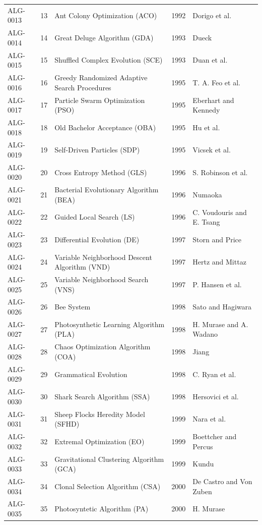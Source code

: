 \documentclass[8pt]{article}
\begin{document}
\begin{landscape}
\begin{longtable}{P{1.7cm}rP{10.0cm}rP{7.2cm}}
ALG-0013 & 13 & Ant Colony Optimization (ACO) & 1992 & Dorigo et al. \\
ALG-0014 & 14 & Great Deluge Algorithm (GDA) & 1993 & Dueck \\
ALG-0015 & 15 & Shuffled Complex Evolution (SCE) & 1993 & Duan et al. \\
ALG-0016 & 16 & Greedy Randomized Adaptive Search Procedures & 1995 & T. A. Feo et al. \\
ALG-0017 & 17 & Particle Swarm Optimization (PSO) & 1995 & Eberhart and Kennedy \\
ALG-0018 & 18 & Old Bachelor Acceptance (OBA) & 1995 & Hu et al. \\
ALG-0019 & 19 & Self-Driven Particles (SDP) & 1995 & Vicsek et al. \\
ALG-0020 & 20 & Cross Entropy Method (GLS) & 1996 & S. Robinson et al. \\
ALG-0021 & 21 & Bacterial Evolutionary Algorithm (BEA) & 1996 & Numaoka \\
ALG-0022 & 22 & Guided Local Search (LS) & 1996 & C. Voudouris and E. Tsang \\
ALG-0023 & 23 & Differential Evolution (DE) & 1997 & Storn and Price \\
ALG-0024 & 24 & Variable Neighborhood Descent Algorithm (VND) & 1997 & Hertz and Mittaz \\
ALG-0025 & 25 & Variable Neighborhood Search (VNS) & 1997 & P. Hansen et al. \\
ALG-0026 & 26 & Bee System & 1998 & Sato and Hagiwara \\
ALG-0027 & 27 & Photosynthetic Learning Algorithm (PLA) & 1998 & H. Murase and A. Wadano \\
ALG-0028 & 28 & Chaos Optimization Algorithm (COA) & 1998 & Jiang \\
ALG-0029 & 29 & Grammatical Evolution & 1998 & C. Ryan et al. \\
ALG-0030 & 30 & Shark Search Algorithm (SSA) & 1998 & Hersovici et al. \\
ALG-0031 & 31 & Sheep Flocks Heredity Model (SFHD) & 1999 & Nara et al. \\
ALG-0032 & 32 & Extremal Optimization (EO) & 1999 & Boettcher and Percus \\
ALG-0033 & 33 & Gravitational Clustering Algorithm (GCA) & 1999 & Kundu \\
ALG-0034 & 34 & Clonal Selection Algorithm (CSA) & 2000 & De Castro and Von Zuben \\
ALG-0035 & 35 & Photosyntetic Algorithm (PA) & 2000 & H. Murase \\

\end{longtable}
\end{landscape}
\end{document}
